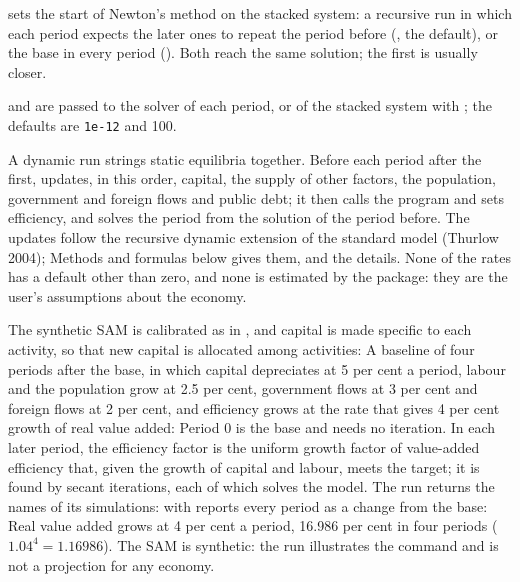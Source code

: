 \begin{optdesc}
\item[\optarg{}{start}{recursive|base}] sets the start of Newton's method on
the stacked system: a recursive run in which each period expects the later
ones to repeat the period before (, the default), or the base
in every period (). Both reach the same solution; the first is
usually closer.

\item[\optarg{tol}{erance}{\#}] and  are passed to the
solver of each period, or of the stacked system with ; the
defaults are \texttt{1e-12} and 100.
\end{optdesc}


A dynamic run strings static equilibria together. Before each period after
the first,  updates, in this order, capital, the supply of
other factors, the population, government and foreign flows and public debt;
it then calls the  program and sets efficiency, and solves the
period from the solution of the period before. The updates follow the
recursive dynamic extension of the standard model (Thurlow 2004);
Methods and formulas below gives them, and  the
details. None of the rates has a default other than zero, and none is
estimated by the package: they are the user's assumptions about the economy.


The synthetic SAM is calibrated as in , and capital is made
specific to each activity, so that new capital is allocated among activities:
A baseline of four periods after the base, in which capital depreciates at 5
per cent a period, labour and the population grow at 2.5 per cent, government
flows at 3 per cent and foreign flows at 2 per cent, and efficiency grows at
the rate that gives 4 per cent growth of real value added:
Period 0 is the base and needs no iteration. In each later period, the
efficiency factor is the uniform growth factor of value-added efficiency
that, given the growth of capital and labour, meets the target; it is found by
secant iterations, each of which solves the model. The run returns the names
of its simulations:
 with  reports every period as a change from the
base:
Real value added grows at 4 per cent a period, 16.986 per cent in four
periods ($1.04^4 = 1.16986$). The SAM is synthetic: the run illustrates the
command and is not a projection for any economy.

